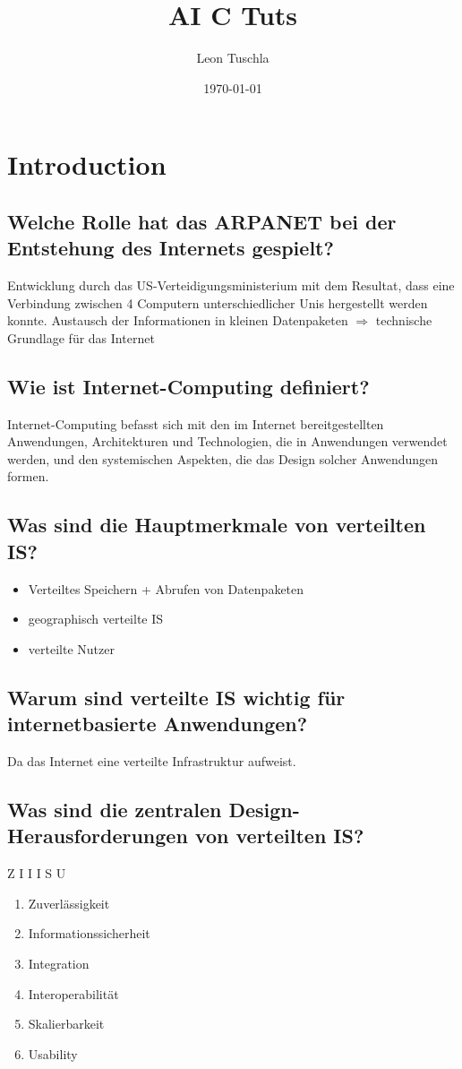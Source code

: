 \documentclass{article}
\title{AI C Tuts}
\author{Leon Tuschla}
\date{\today}
\begin{document}
\maketitle
\section{Introduction}
\subsection{Welche Rolle hat das ARPANET bei der Entstehung des Internets gespielt?}
Entwicklung durch das US-Verteidigungsministerium mit dem Resultat, dass eine Verbindung zwischen 4 Computern unterschiedlicher Unis hergestellt werden konnte. Austausch der Informationen in kleinen Datenpaketen \(\Rightarrow\) technische Grundlage für das Internet
\subsection{Wie ist Internet-Computing definiert?}
Internet-Computing befasst sich mit den im Internet bereitgestellten Anwendungen, Architekturen und Technologien, die in Anwendungen verwendet werden, und den systemischen Aspekten, die das Design solcher Anwendungen formen.
\subsection{Was sind die Hauptmerkmale von verteilten IS?}
\begin{itemize}
    \item Verteiltes Speichern + Abrufen von Datenpaketen
    \item geographisch verteilte IS
    \item verteilte Nutzer
\end{itemize}
\subsection{Warum sind verteilte IS wichtig für internetbasierte Anwendungen?}
Da das Internet eine verteilte Infrastruktur aufweist.
\subsection{Was sind die zentralen Design-Herausforderungen von verteilten IS?}
\Large Z I I I S U
\begin{enumerate}
    \item Zuverlässigkeit
    \item Informationssicherheit
    \item Integration
    \item Interoperabilität
    \item Skalierbarkeit
    \item Usability
\end{enumerate}
\end{document}
